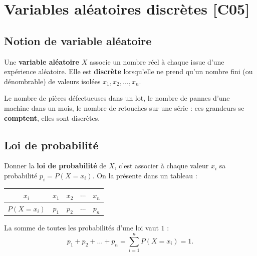 \documentclass[a4paper,11pt]{article}
\begin{document}
\newpage
\tableofcontents
\newpage

\section{Variables aléatoires discrètes \hfill {\normalsize\color{uimmred}[C05]}}

\subsection{Notion de variable aléatoire}

\begin{definition}
Une \textbf{variable aléatoire} $X$ associe un nombre réel à chaque issue d'une expérience aléatoire. Elle est \textbf{discrète} lorsqu'elle ne prend qu'un nombre fini (ou dénombrable) de valeurs isolées $x_1, x_2, \dots, x_n$.
\end{definition}

\begin{exemple}
Le nombre de pièces défectueuses dans un lot, le nombre de pannes d'une machine dans un mois, le nombre de retouches sur une série : ces grandeurs se \textbf{comptent}, elles sont discrètes.
\end{exemple}

\subsection{Loi de probabilité}

\begin{definition}
Donner la \textbf{loi de probabilité} de $X$, c'est associer à chaque valeur $x_i$ sa probabilité $p_i = P(X = x_i)$. On la présente dans un tableau :
\end{definition}

\begin{center}
\renewcommand{\arraystretch}{1.4}
\begin{tabular}{|c|c|c|c|c|}
\hline
\rowcolor{uimmlightblue}
$x_i$ & $x_1$ & $x_2$ & $\cdots$ & $x_n$ \\
\hline
$P(X = x_i)$ & $p_1$ & $p_2$ & $\cdots$ & $p_n$ \\
\hline
\end{tabular}
\end{center}

\begin{theoreme}
La somme de toutes les probabilités d'une loi vaut $1$ :
\[
p_1 + p_2 + \dots + p_n = \sum_{i=1}^{n} P(X = x_i) = 1.
\]
\end{theoreme}
\end{document}
